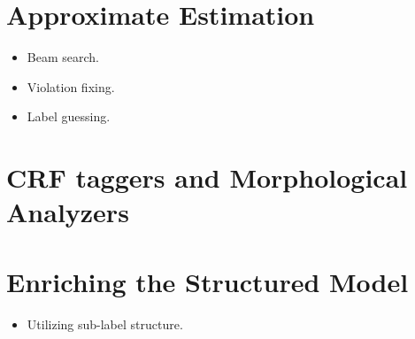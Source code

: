 \section{Approximate Estimation}
\begin{itemize}
\item Beam search.
\item Violation fixing.
\item Label guessing.
\end{itemize}
\section{CRF taggers and Morphological Analyzers}

\section{Enriching the Structured Model}
\begin{itemize}
\item Utilizing sub-label structure.
\end{itemize}
